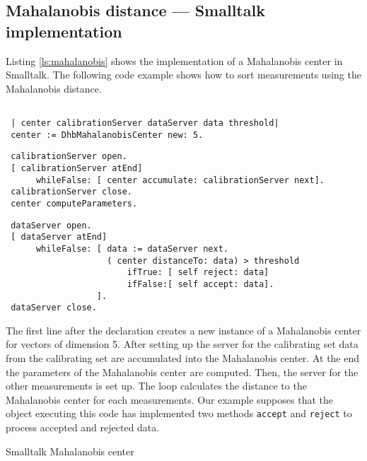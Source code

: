 \documentclass[twoside]{book}
\begin{document}
\subsection{Mahalanobis distance --- Smalltalk implementation}
Listing \ref{ls:mahalanobis} shows the implementation of a
Mahalanobis center in Smalltalk. The following code example shows
how to sort measurements using the Mahalanobis distance.
\begin{codeExample}
\begin{verbatim}

 | center calibrationServer dataServer data threshold|
 center := DhbMahalanobisCenter new: 5.
\end{verbatim}
\begin{verbatim}
 calibrationServer open.
 [ calibrationServer atEnd]
      whileFalse: [ center accumulate: calibrationServer next].
 calibrationServer close.
 center computeParameters.
\end{verbatim}
\begin{verbatim}
 dataServer open.
 [ dataServer atEnd]
      whileFalse: [ data := dataServer next.
                    ( center distanceTo: data) > threshold
                        ifTrue: [ self reject: data]
                        ifFalse:[ self accept: data].
                  ].
 dataServer close.
\end{verbatim}
\end{codeExample}
The first line after the declaration creates a new instance of a
Mahalanobis center for vectors of dimension 5. After setting up
the server for the calibrating set data from the calibrating set
are accumulated into the Mahalanobis center. At the end the
parameters of the Mahalanobis center are computed. Then, the
server for the other measurements is set up. The loop calculates
the distance to the Mahalanobis center for each measurements. Our
example supposes that the object executing this code has
implemented two methods {\tt accept} and {\tt reject} to process
accepted and rejected data.

\begin{listing} Smalltalk Mahalanobis center  \label{ls:mahalanobis}

\end{listing}
\end{document}
